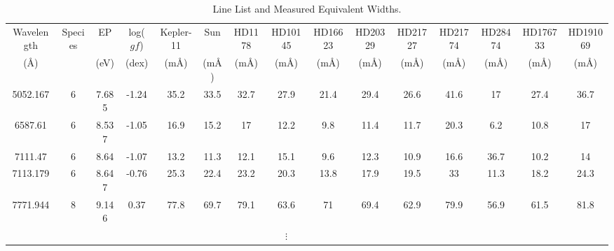 \documentclass[oneside]{emulateapj}
\begin{document}
\pagebreak
\begin{table}
\caption{Line List and Measured Equivalent Widths.}
\label{tbl:ews}
\centering 
\begin{tabular}{ccccccccccccccc} 
\hline
\hline
{Wavelength} & Species & EP & log($gf$) & Kepler-11 & Sun & HD1178 & HD10145 & HD16623 & HD20329 & HD21727 & HD21774 & HD28474 & HD176733 & HD191069 \\
 (\r{A}) &  & (eV) & (dex) & (m\r{A}) & (m\r{A}) & (m\r{A}) & (m\r{A}) & (m\r{A}) & (m\r{A}) & (m\r{A}) & (m\r{A}) & (m\r{A}) & (m\r{A}) & (m\r{A}) \\
\hline
5052.167 & 6  & 7.685 & -1.24 & 35.2 & 33.5 & 32.7 & 27.9 & 21.4 & 29.4 & 26.6 & 41.6 & 17 & 27.4 & 36.7 \\
6587.61 & 6 & 8.537 & -1.05 & 16.9 & 15.2 & 17 & 12.2 & 9.8 & 11.4 & 11.7 & 20.3 & 6.2 & 10.8 & 17 \\
7111.47 & 6 & 8.64 & -1.07 & 13.2 & 11.3 & 12.1 & 15.1 & 9.6 & 12.3 & 10.9 & 16.6 & 36.7 & 10.2 & 14 \\
7113.179 &  6 & 8.647 & -0.76 & 25.3 & 22.4 & 23.2 & 20.3 & 13.8 & 17.9 & 19.5 & 33 & 11.3 & 18.2 & 24.3 \\
7771.944 & 8 & 9.146 & 0.37 & 77.8 & 69.7 & 79.1 & 63.6 & 71 & 69.4 & 62.9 & 79.9 & 56.9 & 61.5 & 81.8 \\
  &  & & & & & & $\vdots$   & &  & & & & \\
\hline       
\end{tabular}


\end{table}


\pagebreak
\end{document}
